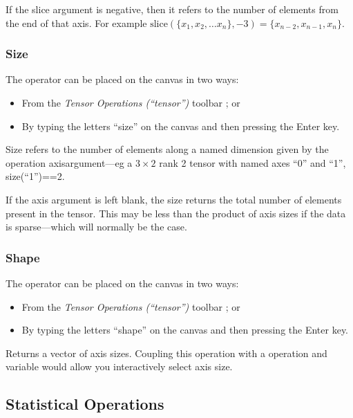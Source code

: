 If the slice argument is negative, then it refers to the number of
elements from the end of that axis. For example $\mathrm{slice}(\{x_{1},x_{2},\ldots x_{n}\},-3)=\{x_{n-2},x_{n-1},x_{n}\}$.

\subsubsection{Size}

\label{Operation:size}


The operator can be placed on the canvas in two ways:
\begin{itemize}
\item From the \emph{Tensor Operations (``tensor'')} toolbar ;
or 
\item By typing the letters ``size'' on the canvas and then pressing the
Enter key.
\end{itemize}
Size refers to the number of elements along a named dimension given
by the operation axisargument---eg a $3\times2$ rank 2 tensor with
named axes ``0'' and ``1'', size(``1'')==2.

If the axis argument is left blank, the size returns the total number
of elements present in the tensor. This may be less than the product
of axis sizes if the data is sparse---which will normally be the
case.

\subsubsection{Shape}

\label{Operation:shape}


The operator can be placed on the canvas in two ways:
\begin{itemize}
\item From the \emph{Tensor Operations (``tensor'')} toolbar ;
or 
\item By typing the letters ``shape'' on the canvas and then pressing the
Enter key.
\end{itemize}
Returns a vector of axis sizes. Coupling this operation with a
 operation and variable would allow
you interactively select axis size.

\subsection{Statistical Operations}

